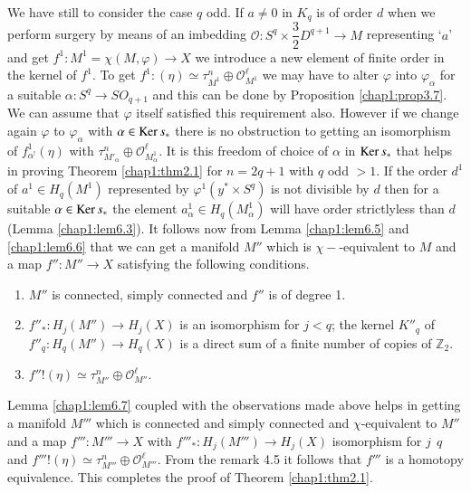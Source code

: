 We have still to consider the case $q$ odd. If $a \neq 0$ in $K_q$ is
of order $d$ when we perform surgery by means of an imbedding
$\mathscr{O} : S^q \times \dfrac{3}{2} D^{q+1} \to M$ representing
`$a$' and get $f^1 : M^1 = \chi (M, \varphi ) \to X$ we introduce a
new element of finite order in the kernel of $f^1$. To get $f^1 :
(\eta ) \simeq \tau^n _{M^1} \oplus \mathscr{O}_{M^1}^\ell$ we may have
to alter $\varphi$ into $\varphi_\alpha$ for a suitable $\alpha : S^q
\to SO_{q+1}$ and this can be done by Proposition
\ref{chap1:prop3.7}. We can assume 
that $\varphi$ itself satisfied this requirement also. However if we
change again $\varphi$ to $\varphi _\alpha$ with $\alpha \in \operatorname{Ker}
s_*$ there is no obstruction to getting an isomorphism of
$f^1_{\alpha^!} (\eta )$ with $\tau^n_{M'_\alpha} \oplus
\mathscr{O}_{M^1_\alpha}^\ell$. It is this freedom of choice of
$\alpha$ in $ \operatorname{Ker} s_*$ that helps in proving Theorem \ref{chap1:thm2.1} for $n = 2q
+ 1$ with $q$ odd $> 1$. If the order $d^1$ of $a^1 \in H_q
(M^1)$ represented by $\varphi^1 (y^* \times S^q )$ is not divisible
by $d$ then for a suitable $\alpha \in \operatorname{Ker} s_*$ the element
$a^1_\alpha \in  H_q (M^1_\alpha)$ will have order
strictly\pageoriginale less 
than $d$ (Lemma \ref{chap1:lem6.3}). It follows now from Lemma
\ref{chap1:lem6.5} and \ref{chap1:lem6.6} that we 
can get a manifold $M''$ which is $\chi-$-equivalent to $M$ and a map
$f'' : M'' \to X$ satisfying the following conditions.  
\begin{enumerate}
\item $M''$ is connected, simply connected and $f''$ is of degree 1.

\item $f''_* : H_j (M'') \to H_j (X)$  is an isomorphism for $j < q$;
  the kernel $K''_q$ of $f''_q : H_q (M'') \to H_q (X)$ is a direct
  sum of a finite number of copies of $\mathbb{Z}_2$. 

\item $f'' ! (\eta) \simeq \tau^n_{M''} \oplus \mathscr{O}^\ell_{M''}$.
\end{enumerate}

Lemma \ref{chap1:lem6.7} coupled with the observations made above helps in getting a
manifold $M'''$ which is connected and simply connected and
$\chi$-equivalent to $M''$ and a map $f''' : M''' \to X$ with $f'''_*
: H_j (M''') \to H_j (X)$ isomorphism for $j~~q$  and $f''' ! (\eta)
\simeq \tau_{M'''}^n \oplus \mathscr{O}^\ell_{M'''}$. From the remark
4.5 it follows that $f'''$ is a homotopy equivalence. This completes
the proof of Theorem \ref{chap1:thm2.1}. 

